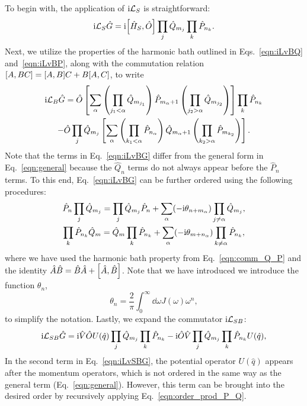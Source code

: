 \documentclass[preprint,aip,jcp]{revtex4-2}
\newcommand{\im}{\textup{i}}
\newcommand{\Lv}{\mathcal{L}}
\begin{document}
To begin with, the application of $\im\Lv_S$ is straightforward:
\begin{equation}\label{eqn:iLvSG}
    \im\Lv_S \hat{G} = \im \comm{\hat{H}_S}{\hat{O}} \prod_{j} \hat{Q}_{m_j} \prod_{k} \hat{P}_{n_k}.
\end{equation}
Next, we utilize the properties of the harmonic bath outlined in Eqs.~\ref{eqn:iLvBQ} and~\ref{eqn:iLvBP}, along with the commutation relation
$\comm{A}{BC} = \comm{A}{B} C + B\comm{A}{C}$, to write 
\begin{multline}\label{eqn:iLvBG}
    \im \Lv_{B} \hat{G} = \hat{O} \left[\sum_{\alpha} \left(\prod_{j_1 < \alpha} \hat{Q}_{m_{j_1}} \right) \hat{P}_{m_{\alpha}+1}  \left(\prod_{j_2 > \alpha} \hat{Q}_{m_{j_2}} \right)  \right] \prod_k \hat{P}_{n_k} \\ 
    - \hat{O} \prod_{j} \hat{Q}_{m_j}
    \left[\sum_{\alpha} \left(\prod_{k_1 < \alpha} \hat{P}_{n_{\alpha}} \right) \hat{Q}_{m_{\alpha} + 1}  \left(\prod_{k_2 > \alpha} \hat{P}_{m_{k_2}} \right)  \right].
\end{multline}
Note that the terms in Eq.~\ref{eqn:iLvBG} differ from the general form in Eq.~\ref{eqn:general} because the $\hat{Q}_n$ terms do not always appear before the $\hat{P}_n$ terms. To this end, Eq.~\ref{eqn:iLvBG} can be further ordered using the following procedures:
\begin{gather}
    \hat{P}_n \prod_{j} \hat{Q}_{{m}_j} = \prod_{j} \hat{Q}_{{m}_j} \hat{P}_n  + \sum_{\alpha} (-\im \theta_{n+m_{\alpha}}) \prod_{j\neq\alpha} \hat{Q}_{{m}_j}, \label{eqn:order_P_prod_Q}\\
    \prod_{k} \hat{P}_{n_k} \hat{Q}_{m} = \hat{Q}_{m} \prod_{k} \hat{P}_{n_k} + \sum_{\alpha}  (-\im \theta_{m+n_{\alpha}}) \prod_{k\neq\alpha} \hat{P}_{{n}_k}, \label{eqn:order_prod_P_Q}
\end{gather}
where we have used the harmonic bath property from Eq.~\ref{eqn:comm_Q_P} and the identity $\hat{A}\hat{B} = \hat{B}\hat{A} + \comm{\hat{A}}{\hat{B}}$. Note that we have introduced we introduce the function $\theta_n$,
\begin{equation}\label{eqn:theta}
    \theta_n = \frac{2}{\pi} \int_{0}^{\infty} \dd{\omega} J(\omega) \omega^{n}, 
\end{equation}
to simplify the notation. Lastly, we expand the commutator $\im \Lv_{SB}$:
\begin{equation} \label{eqn:iLvSBG}
    \im \Lv_{SB} \hat{G} = \im \hat{V} \hat{O} U(\hat{q}) \prod_{j} \hat{Q}_{m_j} \prod_{k} \hat{P}_{n_k}
    - \im \hat{O} \hat{V} \prod_{j} \hat{Q}_{m_j}  \prod_{k} \hat{P}_{n_k} U(\hat{q}), 
\end{equation}
In the second term in Eq.~\ref{eqn:iLvSBG}, the potential operator $U(\hat{q})$
appears after the momentum operators, which is not ordered in the same way as the general term (Eq.~\ref{eqn:general}). However, this term can be brought into the desired order by recursively applying Eq.~\ref{eqn:order_prod_P_Q}.
\end{document}
